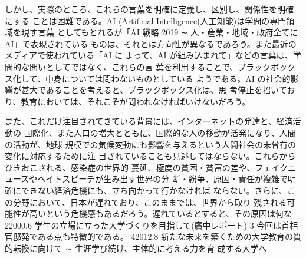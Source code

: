 \documentclass[
]{book}
\theoremstyle{definition}
\theoremstyle{definition}
\theoremstyle{definition}
\theoremstyle{definition}
\theoremstyle{remark}
\begin{document}
しかし、実際のところ、これらの言葉を明確に定義し、区別し、関係性を明確にする ことは困難である。AI (Artificial Intelligence(人工知能)は学問の専門領域を現す言葉 としてもとれるが「AI 戦略 2019 ∼ 人・産業・地域・政府全てに AI」で表現されている ものは、それとは方向性が異なるであろう。また最近のメディアで使われている「AI に よって、AI が組み込まれて」などの言葉は、学問的な問いとしてではなく、これらの言 葉を利用することで、ブラックボックス化して、中身については問わないものとしている ようである。AI の社会的影響が甚大であることを考えると、ブラックボックス化は、思 考停止を招いており、教育においては、それこそが問われなければいけないだろう。

また、これだけ注目されてきている背景には、インターネットの発達と、経済活動の 国際化、また人口の増大とともに、国際的な人の移動が活発になり、人間の活動が、地球 規模での気候変動にも影響を与えるという人間社会の未曾有の変化に対応するために注 目されていることも見逃してはならない。これらからひきおこされる、感染症の世界的 蔓延、極度の貧困・貧富の差や、フェイクニュースやヘイトスピーチが生み出す世界の分 断・紛争、原因・責任が複雑で明確にできない経済危機にも、立ち向かって行かなければ ならない。さらに、この分野において、日本が遅れており、このままでは、世界から取り 残される可能性が高いという危機感もあるだろう。遅れているとすると、その原因は何な
22000.6 学生の立場に立った大学づくりを目指して(廣中レポート)
3 今回は首相官邸発である点も特徴的である。
42012.8 新たな未来を築くための大学教育の質的転換に向けて ∼ 生涯学び続け、主体的に考える力を育
成する大学へ
\end{document}
